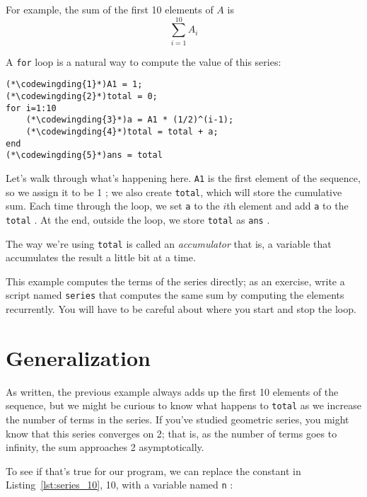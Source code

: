 
For example, the sum of the first 10 elements of $A$ is
\begin{equation}
\sum_{i=1}^{10} A_i
\end{equation}

A {\tt for} loop is a natural way to compute the value of this series:

\begin{lstlisting}[caption={A program that calculates a simple series}, label={lst:series_10}]
(*\codewingding{1}*)A1 = 1;
(*\codewingding{2}*)total = 0;
for i=1:10
    (*\codewingding{3}*)a = A1 * (1/2)^(i-1);
    (*\codewingding{4}*)total = total + a;
end
(*\codewingding{5}*)ans = total
\end{lstlisting}

Let's walk through what's happening here. {\tt A1} is the first element of the sequence, so we assign it to be 1 ; we also create {\tt total}, which will store the cumulative sum.
Each time through the loop, we set {\tt a} to the $i$th element  and add {\tt a} to the {\tt total} .
At the end, outside the loop, we store {\tt total} as {\tt ans} .

The way we're using {\tt total} is called an \emph{accumulator} that is, a variable that accumulates the result a little bit at a time.  



\begin{ex}
This example computes the terms of the series directly; as
an exercise, write a script named {\tt series} that computes
the same sum by computing the elements recurrently.  You will
have to be careful about where you start and stop the loop.
\end{ex}


\section{Generalization}


As written, the previous example always adds up the first 10
elements of the sequence, but we might be curious to know what
happens to {\tt total} as we increase the
number of terms in the series.  If you've studied geometric
series, you might know that this series converges on 2; that is,
as the number of terms goes to infinity, the sum approaches
2 asymptotically.

To see if that's true for our program, we can replace the
constant in Listing~\ref{lst:series_10}, 10, with a variable named {\tt n} :

